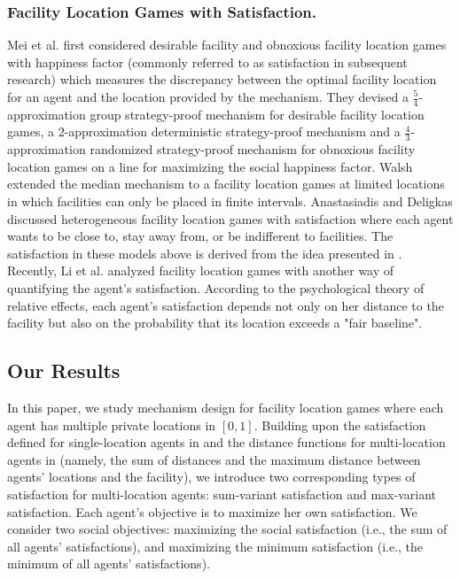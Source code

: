 \documentclass[runningheads]{11llncst}
\begin{document}
\subsubsection{Facility Location Games with Satisfaction.} Mei et al. \cite{mei2019facility} first considered  desirable facility  and obnoxious facility location games with happiness factor (commonly referred to as satisfaction in subsequent research) which measures the discrepancy between the optimal facility location
for an agent and the location provided by the mechanism.  They devised a $\frac{5}{4}$-approximation group strategy-proof mechanism for desirable facility location games, a $2$-approximation deterministic strategy-proof mechanism and a $\frac{4}{3}$-approximation randomized strategy-proof mechanism for obnoxious facility location games on a line for maximizing the social happiness factor. Walsh \cite{walsh2021strategy} extended the median mechanism to a facility location games at limited locations in which facilities can only be placed in finite intervals. Anastasiadis and Deligkas  \cite{anastasiadis2018heterogeneous} discussed heterogeneous facility location games with satisfaction where each agent wants to be  close to, stay away from, or be indifferent to facilities. The satisfaction in these models above is derived from the idea presented in \cite{mei2019facility}. Recently, Li et al. \cite{li2025strategy} analyzed facility location games with another way of quantifying the agent's satisfaction. According to the psychological theory of relative effects, each agent's satisfaction depends  not only on her distance to the facility but also on the probability that its location exceeds a "fair baseline".


\vspace{-0.3cm}
\subsection{Our Results}  
In this paper, we study mechanism design  for facility location games where each agent has multiple private locations in $[0,1]$. Building upon the satisfaction defined for single-location agents in \cite{mei2019facility} and the distance functions for multi-location agents in \cite{procaccia2009approximate} (namely, the sum of distances and the maximum distance between agents' locations and the facility), we introduce two corresponding types of  satisfaction  for multi-location agents: sum-variant satisfaction and max-variant satisfaction. Each agent's objective is to maximize her own satisfaction. We consider two social objectives: maximizing the social satisfaction (i.e., the sum of all agents' satisfactions), and maximizing the minimum satisfaction (i.e., the minimum  of all agents' satisfactions). 
\end{document}
